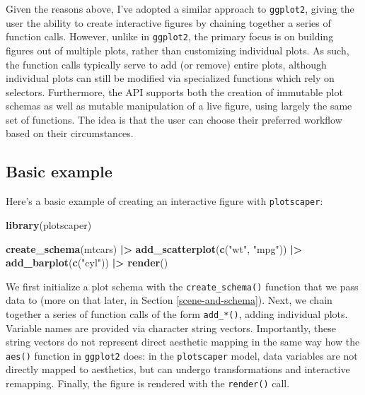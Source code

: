 \documentclass[
]{book}
\newenvironment{Shaded}{\begin{snugshade}}{\end{snugshade}}
\newcommand{\FunctionTok}[1]{\textcolor[rgb]{0.13,0.29,0.53}{\textbf{#1}}}
\newcommand{\NormalTok}[1]{#1}
\newcommand{\SpecialCharTok}[1]{\textcolor[rgb]{0.81,0.36,0.00}{\textbf{#1}}}
\newcommand{\StringTok}[1]{\textcolor[rgb]{0.31,0.60,0.02}{#1}}
\theoremstyle{definition}
\theoremstyle{definition}
\theoremstyle{definition}
\theoremstyle{definition}
\theoremstyle{remark}
\begin{document}
Given the reasons above, I've adopted a similar approach to \texttt{ggplot2}, giving the user the ability to create interactive figures by chaining together a series of function calls. However, unlike in \texttt{ggplot2}, the primary focus is on building figures out of multiple plots, rather than customizing individual plots. As such, the function calls typically serve to add (or remove) entire plots, although individual plots can still be modified via specialized functions which rely on selectors. Furthermore, the API supports both the creation of immutable plot schemas as well as mutable manipulation of a live figure, using largely the same set of functions. The idea is that the user can choose their preferred workflow based on their circumstances.

\subsection{Basic example}\label{basic-example}

Here's a basic example of creating an interactive figure with \texttt{plotscaper}:

\begin{Shaded}
\begin{Highlighting}[]
\FunctionTok{library}\NormalTok{(plotscaper)}

\FunctionTok{create\_schema}\NormalTok{(mtcars) }\SpecialCharTok{|\textgreater{}}
  \FunctionTok{add\_scatterplot}\NormalTok{(}\FunctionTok{c}\NormalTok{(}\StringTok{"wt"}\NormalTok{, }\StringTok{"mpg"}\NormalTok{)) }\SpecialCharTok{|\textgreater{}}
  \FunctionTok{add\_barplot}\NormalTok{(}\FunctionTok{c}\NormalTok{(}\StringTok{"cyl"}\NormalTok{)) }\SpecialCharTok{|\textgreater{}}
  \FunctionTok{render}\NormalTok{()}
\end{Highlighting}
\end{Shaded}

We first initialize a plot schema with the \texttt{create\_schema()} function that we pass data to (more on that later, in Section \ref{scene-and-schema}). Next, we chain together a series of function calls of the form \texttt{add\_*()}, adding individual plots. Variable names are provided via character string vectors. Importantly, these string vectors do not represent direct aesthetic mapping in the same way how the \texttt{aes()} function in \texttt{ggplot2} does: in the \texttt{plotscaper} model, data variables are not directly mapped to aesthetics, but can undergo transformations and interactive remapping. Finally, the figure is rendered with the \texttt{render()} call.
\end{document}
